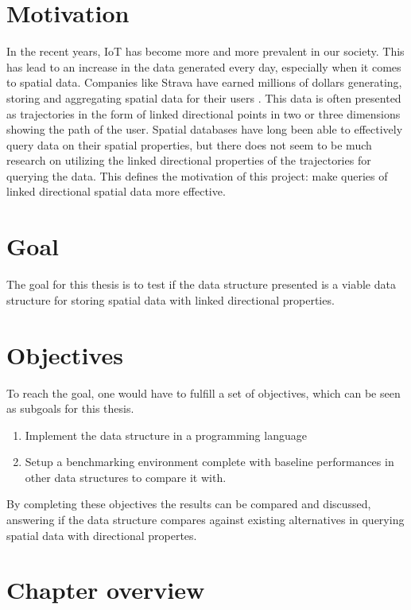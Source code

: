 \section{Motivation}\label{sec:motivation}

In the recent years, IoT has become more and more prevalent in our society. This has lead to an increase in the data generated every day, especially when it comes to spatial data. Companies like Strava have earned millions of dollars generating, storing and aggregating spatial data for their users \cite{strava_worth}. This data is often presented as trajectories in the form of linked directional points in two or three dimensions showing the path of the user. Spatial databases have long been able to effectively query data on their spatial properties, but there does not seem to be much research on utilizing the linked directional properties of the trajectories for querying the data. This defines the motivation of this project: make queries of linked directional spatial data more effective.
\section{Goal}
The goal for this thesis is to test if the data structure presented is a viable data structure for storing spatial data with linked directional properties.


\section{Objectives}


To reach the goal, one would have to fulfill a set of objectives, which can be seen as subgoals for this thesis.
\begin{enumerate}
	\item Implement the data structure in a programming language
	\item Setup a benchmarking environment complete with baseline performances in other data structures to compare it with.
\end{enumerate}

By completing these objectives the results can be compared and discussed, answering if the data structure compares against existing alternatives in querying spatial data with directional propertes.

\section{Chapter overview}

